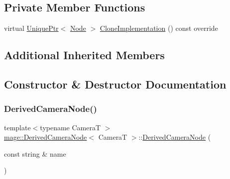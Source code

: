 \subsection*{Private Member Functions}
\begin{DoxyCompactItemize}
\item 
virtual \hyperlink{namespacemage_a8c307fbcc33bce9b7f2aa4c26c3b95cf}{Unique\+Ptr}$<$ \hyperlink{classmage_1_1_node}{Node} $>$ \hyperlink{classmage_1_1_derived_camera_node_aa965751029ebd6b41d3805b499a8304e}{Clone\+Implementation} () const override
\end{DoxyCompactItemize}
\subsection*{Additional Inherited Members}


\subsection{Constructor \& Destructor Documentation}
\hypertarget{classmage_1_1_derived_camera_node_af1886e653207481bdde0864b23ba8ca4}{}\label{classmage_1_1_derived_camera_node_af1886e653207481bdde0864b23ba8ca4} 
\subsubsection{\texorpdfstring{Derived\+Camera\+Node()}{DerivedCameraNode()}\hspace{0.1cm}{\footnotesize\ttfamily [1/4]}}
{\footnotesize\ttfamily template$<$typename CameraT $>$ \\
\hyperlink{classmage_1_1_derived_camera_node}{mage\+::\+Derived\+Camera\+Node}$<$ CameraT $>$\+::\hyperlink{classmage_1_1_derived_camera_node}{Derived\+Camera\+Node} (\begin{DoxyParamCaption}\item[{const string \&}]{name }\end{DoxyParamCaption})\hspace{0.3cm}{\ttfamily [explicit]}}

\hypertarget{classmage_1_1_derived_camera_node_a629ba0e2c1e6b29e6d45996256c59dbe}{}\label{classmage_1_1_derived_camera_node_a629ba0e2c1e6b29e6d45996256c59dbe} 
